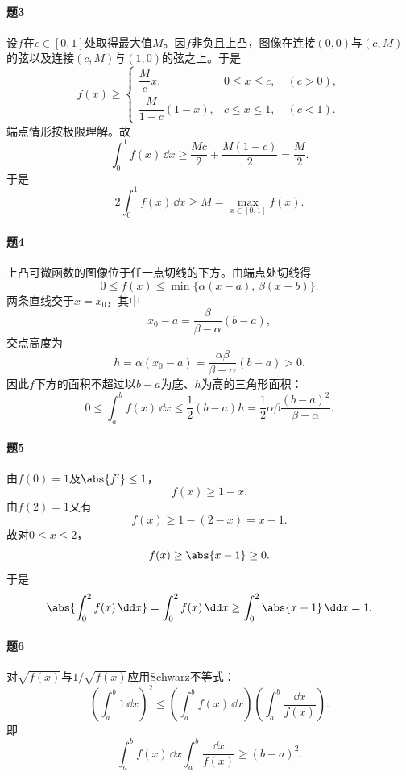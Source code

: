 \paragraph{题3}
\begin{xsolution}
设$f$在$c\in[0,1]$处取得最大值$M$。因$f$非负且上凸，图像在连接$(0,0)$与$(c,M)$的弦以及连接$(c,M)$与$(1,0)$的弦之上。于是
\[
 f(x)\ge
 \begin{cases}
 \dfrac{M}{c}x,&0\le x\le c,\quad(c>0),\\[4pt]
 \dfrac{M}{1-c}(1-x),&c\le x\le1,\quad(c<1).
 \end{cases}
\]
端点情形按极限理解。故
\[
 \int_0^1f(x)\,\dd x
 \ge\frac{Mc}{2}+\frac{M(1-c)}2
 =\frac M2.
\]
于是
\[
 2\int_0^1f(x)\,\dd x\ge M=\max_{x\in[0,1]}f(x).
\]
\end{xsolution}

\paragraph{题4}
\begin{xsolution}
上凸可微函数的图像位于任一点切线的下方。由端点处切线得
\[
 0\le f(x)\le\min\{\alpha(x-a),\,\beta(x-b)\}.
\]
两条直线交于$x=x_0$，其中
\[
 x_0-a=\frac{\beta}{\beta-\alpha}(b-a),
\]
交点高度为
\[
 h=\alpha(x_0-a)=\frac{\alpha\beta}{\beta-\alpha}(b-a)>0.
\]
因此$f$下方的面积不超过以$b-a$为底、$h$为高的三角形面积：
\[
 0\le\int_a^bf(x)\,\dd x
 \le\frac12(b-a)h
 =\frac12\alpha\beta\frac{(b-a)^2}{\beta-\alpha}.
\]
\end{xsolution}

\paragraph{题5}
\begin{xsolution}
由$f(0)=1$及$\abs{f'}\le1$，
\[
 f(x)\ge1-x.
\]
由$f(2)=1$又有
\[
 f(x)\ge1-(2-x)=x-1.
\]
故对$0\le x\le2$，
\[
 f(x)\ge\abs{x-1}\ge0.
\]
于是
\[
 \abs{\int_0^2f(x)\,\dd x}
 =\int_0^2f(x)\,\dd x
 \ge\int_0^2\abs{x-1}\,\dd x=1.
\]
\end{xsolution}

\paragraph{题6}
\begin{xsolution}
对$\sqrt{f(x)}$与$1/\sqrt{f(x)}$应用Schwarz不等式：
\[
 \left(\int_a^b1\,\dd x\right)^2
 \le\left(\int_a^bf(x)\,\dd x\right)
 \left(\int_a^b\frac{\dd x}{f(x)}\right).
\]
即
\[
 \int_a^bf(x)\,\dd x\int_a^b\frac{\dd x}{f(x)}\ge(b-a)^2.
\]
\end{xsolution}


